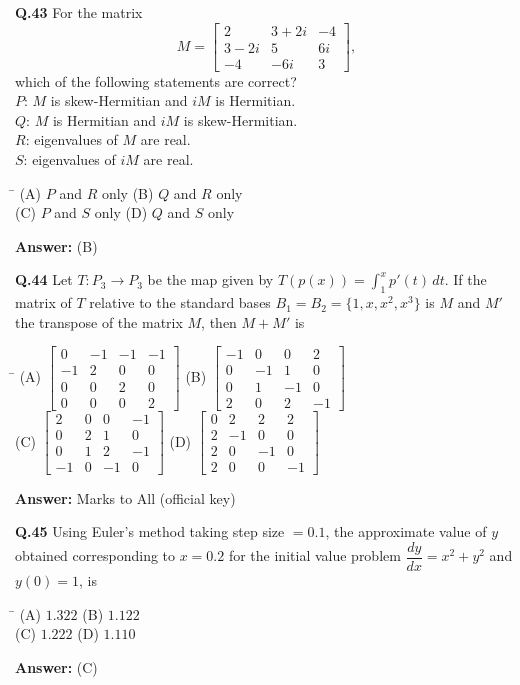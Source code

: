 \documentclass[11pt,a4paper]{article}
\newcommand{\optsfourA}[4]{%
  \begin{tabbing}
    \hspace{0.48\linewidth}\=\kill
    (A) #1 \> (B) #2 \\[2pt]
    (C) #3 \> (D) #4
  \end{tabbing}%
}
\newcommand{\ans}[1]{\textbf{Answer:} #1\par\medskip}
\begin{document}
\textbf{Q.43} For the matrix
\[
  M = \begin{bmatrix} 2 & 3 + 2i & -4 \\ 3 - 2i & 5 & 6i \\ -4 & -6i & 3 \end{bmatrix},
\]
which of the following statements are correct?\\
$P$: $M$ is skew-Hermitian and $iM$ is Hermitian.\\
$Q$: $M$ is Hermitian and $iM$ is skew-Hermitian.\\
$R$: eigenvalues of $M$ are real.\\
$S$: eigenvalues of $iM$ are real.
\optsfourA{$P$ and $R$ only}{$Q$ and $R$ only}{$P$ and $S$ only}{$Q$ and $S$ only}
\ans{(B)}

\textbf{Q.44} Let $T : P_3 \to P_3$ be the map given by $T(p(x)) = \displaystyle\int_1^x p'(t)\,dt$. If the matrix of $T$ relative to the standard bases $B_1 = B_2 = \{1, x, x^2, x^3\}$ is $M$ and $M'$ the transpose of the matrix $M$, then $M + M'$ is
\optsfourA{$\begin{bmatrix} 0 & -1 & -1 & -1 \\ -1 & 2 & 0 & 0 \\ 0 & 0 & 2 & 0 \\ 0 & 0 & 0 & 2 \end{bmatrix}$}{$\begin{bmatrix} -1 & 0 & 0 & 2 \\ 0 & -1 & 1 & 0 \\ 0 & 1 & -1 & 0 \\ 2 & 0 & 2 & -1 \end{bmatrix}$}{$\begin{bmatrix} 2 & 0 & 0 & -1 \\ 0 & 2 & 1 & 0 \\ 0 & 1 & 2 & -1 \\ -1 & 0 & -1 & 0 \end{bmatrix}$}{$\begin{bmatrix} 0 & 2 & 2 & 2 \\ 2 & -1 & 0 & 0 \\ 2 & 0 & -1 & 0 \\ 2 & 0 & 0 & -1 \end{bmatrix}$}
\ans{Marks to All (official key)}

\textbf{Q.45} Using Euler's method taking step size $= 0.1$, the approximate value of $y$ obtained corresponding to $x = 0.2$ for the initial value problem $\dfrac{dy}{dx} = x^2 + y^2$ and $y(0) = 1$, is
\optsfourA{$1.322$}{$1.122$}{$1.222$}{$1.110$}
\ans{(C)}
\end{document}
